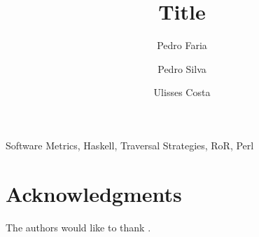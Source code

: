 \documentclass[citeauthoryear]{llncs}
\title{Title}
\author{Pedro Faria \and Pedro Silva \and  Ulisses Costa}
\institute{Department of Informatics, University of Minho}
\begin{document}
\maketitle



\keywords Software Metrics, Haskell, Traversal Strategies, RoR, Perl




\section*{Acknowledgments}
The authors would like to thank .


\end{document}
